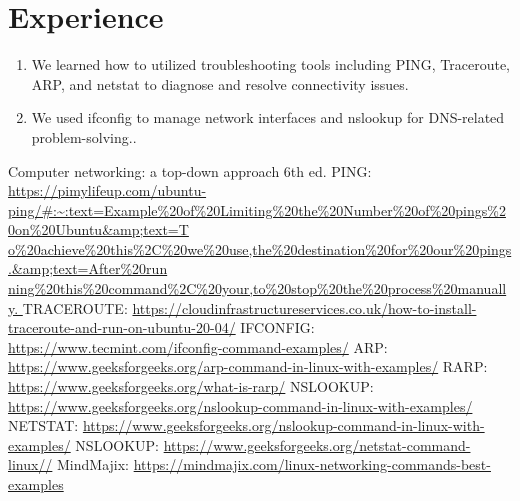 \documentclass[11pt]{article}
\begin{document}
\newpage
\section{Experience}
\begin{enumerate}
\item We learned how to utilized troubleshooting tools including PING, Traceroute, ARP, and netstat to diagnose and resolve connectivity issues.
\item We used ifconfig to manage network interfaces and nslookup for DNS-related problem-solving..
\end{enumerate}

\begin{thebibliography}{1}
  Computer networking: a top-down approach 6th ed.
 PING: \url{https://pimylifeup.com/ubuntu-
ping/#:~:text=Example%
o%
ning%
}
 TRACEROUTE: \url{https://cloudinfrastructureservices.co.uk/how-to-install-traceroute-and-run-on-ubuntu-20-04/}
 IFCONFIG: \url{https://www.tecmint.com/ifconfig-command-examples/}
 ARP: \url{https://www.geeksforgeeks.org/arp-command-in-linux-with-examples/}
 RARP: \url{https://www.geeksforgeeks.org/what-is-rarp/}
 NSLOOKUP: \url{https://www.geeksforgeeks.org/nslookup-command-in-linux-with-examples/}
 NETSTAT: \url{https://www.geeksforgeeks.org/nslookup-command-in-linux-with-examples/}
 NSLOOKUP: \url{https://www.geeksforgeeks.org/netstat-command-linux//}
 MindMajix: \url{https://mindmajix.com/linux-networking-commands-best-examples}
\end{thebibliography}
\end{document}
